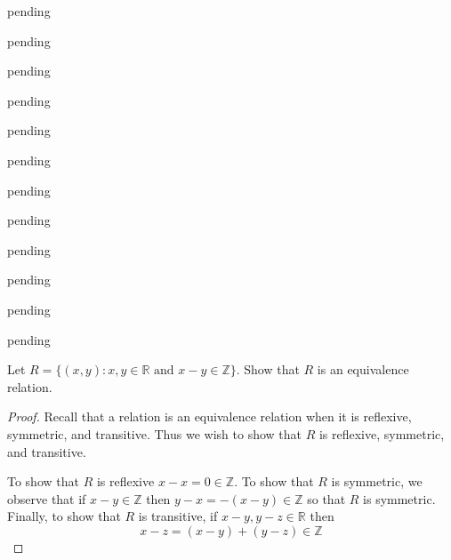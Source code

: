 \begin{exercise} \label{0.53}
	pending
\end{exercise}

\begin{exercise} \label{0.54}
	pending
\end{exercise}

\begin{exercise} \label{0.55}
	pending
\end{exercise}

\begin{exercise} \label{0.56}
	pending
\end{exercise}

\begin{exercise} \label{0.57}
	pending
\end{exercise}

\begin{exercise} \label{0.58}
	pending
\end{exercise}

\begin{exercise} \label{0.59}
	pending
\end{exercise}

\begin{exercise} \label{0.60}
	pending
\end{exercise}

\begin{exercise} \label{0.61}
	pending
\end{exercise}

\begin{exercise} \label{0.62}
	pending
\end{exercise}

\begin{exercise} \label{0.63}
	pending
\end{exercise}

\begin{exercise} \label{0.64}
	pending
\end{exercise}

\begin{exercise} \label{0.65}
	Let \( R = \{ (x,y): x,y \in \mathbb{R} \text{ and } x-y \in \mathbb{Z} \} \). Show that \( R \) is an equivalence relation.
	
	\begin{proof}
	    Recall that a relation is an equivalence relation when it is reflexive, symmetric, and transitive. Thus we wish to show that \( R \) is reflexive, symmetric, and transitive.
	    
	    To show that \( R \) is reflexive \( x - x = 0 \in \mathbb{Z} \). To show that \( R \) is symmetric, we observe that if \( x - y \in \mathbb{Z} \) then \( y - x = -(x-y) \in \mathbb{Z} \) so that \( R \) is symmetric. Finally, to show that \( R \) is transitive, if \( x - y, y - z \in \mathbb{R} \) then 
	    \[ x - z = (x - y) + (y - z) \in \mathbb{Z} \]
	\end{proof}
\end{exercise}

